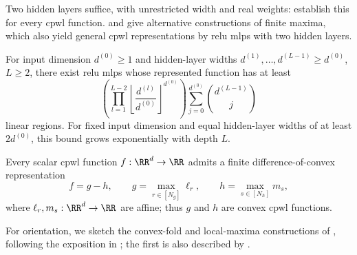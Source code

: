 Two hidden layers suffice, with unrestricted width and real weights: \textcite{Brunck2026TwoReLULayers} establish this for every \ac{cpwl} function. \textcite{Zimmermann2026Caterpillar} and \textcite{TallavarjulaRastegar2026TwoHiddenLayers} give alternative constructions of finite maxima, which also yield general \ac{cpwl} representations by \ac{relu} \acp{mlp} with two hidden layers.

\begin{theoremenv}\label{thm:linear_region_count}
For input dimension $d^{(0)}\ge1$ and hidden-layer widths $d^{(1)},\ldots,d^{(L-1)}\ge d^{(0)}$, $L\ge2$, there exist \ac{relu} \acp{mlp} whose represented function has at least
\[
\left(\prod_{l=1}^{L-2}\left\lfloor\frac{d^{(l)}}{d^{(0)}}\right\rfloor^{d^{(0)}}\right)
\sum_{j=0}^{d^{(0)}}\binom{d^{(L-1)}}{j}
\]
linear regions. For fixed input dimension and equal hidden-layer widths of at least $2d^{(0)}$, this bound grows exponentially with depth $L$.
\end{theoremenv}

\begin{theoremenv}\label{thm:cpwl_dc_representation}
Every scalar \ac{cpwl} function $f:\RR^d\to\RR$ admits a finite difference-of-convex representation
\begin{equation}
 f=g-h,\qquad g=\max_{r\in[N_g]}\ell_r,\qquad h=\max_{s\in[N_h]}m_s,
 \label{eq:cpwl_dc_representation}
\end{equation}
where $\ell_r,m_s:\RR^d\to\RR$ are affine; thus $g$ and $h$ are convex \ac{cpwl} functions.
\end{theoremenv}

For orientation, we sketch the convex-fold and local-maxima constructions of \textcite{Kripfganz1987_PWAasDC}, following the exposition in \textcite[Appendix~B]{Brandenburg2025_DecompositionPolyhedra}; the first is also described by \textcite[Section~2.1]{Schlueter2021_ConvexDecompPAF}.

